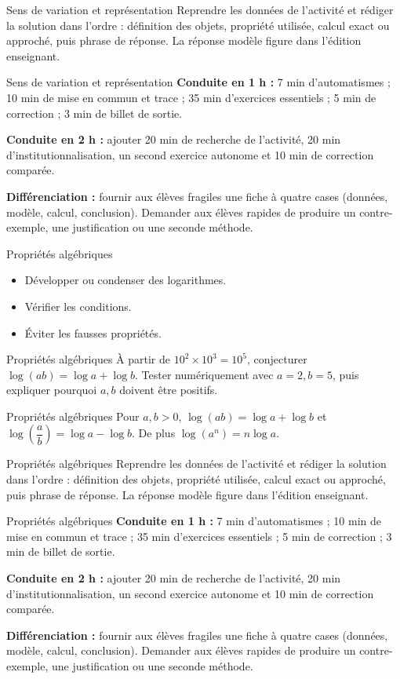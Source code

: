 \documentclass[aspectratio=169,10pt]{beamer}
\begin{document}
\begin{frame}{Sens de variation et représentation}
Reprendre les données de l'activité et rédiger la solution dans l'ordre : définition des objets, propriété utilisée, calcul exact ou approché, puis phrase de réponse. La réponse modèle figure dans l'édition enseignant.
\end{frame}
\begin{frame}{Sens de variation et représentation}
\textbf{Conduite en 1 h :} 7 min d'automatismes ; 10 min de mise en commun et trace ; 35 min d'exercices essentiels ; 5 min de correction ; 3 min de billet de sortie.

\textbf{Conduite en 2 h :} ajouter 20 min de recherche de l'activité, 20 min d'institutionnalisation, un second exercice autonome et 10 min de correction comparée.

\textbf{Différenciation :} fournir aux élèves fragiles une fiche à quatre cases (données, modèle, calcul, conclusion). Demander aux élèves rapides de produire un contre-exemple, une justification ou une seconde méthode.
\end{frame}
\begin{frame}{Propriétés algébriques}
\begin{itemize}
\item Développer ou condenser des logarithmes.
\item Vérifier les conditions.
\item Éviter les fausses propriétés.

\end{itemize}
\end{frame}
\begin{frame}{Propriétés algébriques}
À partir de \(10^2\times10^3=10^5\), conjecturer \(\log(ab)=\log a+\log b\). Tester numériquement avec \(a=2,b=5\), puis expliquer pourquoi \(a,b\) doivent être positifs.
\end{frame}
\begin{frame}{Propriétés algébriques}
Pour \(a,b>0\), \(\log(ab)=\log a+\log b\) et \(\log\!\left(\dfrac ab\right)=\log a-\log b\). De plus \(\log(a^n)=n\log a\).
\end{frame}
\begin{frame}{Propriétés algébriques}
Reprendre les données de l'activité et rédiger la solution dans l'ordre : définition des objets, propriété utilisée, calcul exact ou approché, puis phrase de réponse. La réponse modèle figure dans l'édition enseignant.
\end{frame}
\begin{frame}{Propriétés algébriques}
\textbf{Conduite en 1 h :} 7 min d'automatismes ; 10 min de mise en commun et trace ; 35 min d'exercices essentiels ; 5 min de correction ; 3 min de billet de sortie.

\textbf{Conduite en 2 h :} ajouter 20 min de recherche de l'activité, 20 min d'institutionnalisation, un second exercice autonome et 10 min de correction comparée.

\textbf{Différenciation :} fournir aux élèves fragiles une fiche à quatre cases (données, modèle, calcul, conclusion). Demander aux élèves rapides de produire un contre-exemple, une justification ou une seconde méthode.
\end{frame}
\end{document}
